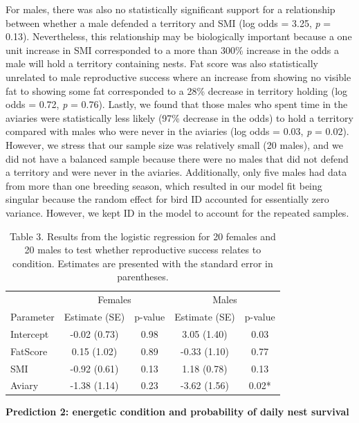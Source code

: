 \documentclass[
]{article}
\begin{document}
For males, there was also no statistically significant support for a
relationship between whether a male defended a territory and SMI (log
odds = 3.25, \emph{p} = 0.13). Nevertheless, this relationship may be
biologically important because a one unit increase in SMI corresponded
to a more than 300\% increase in the odds a male will hold a territory
containing nests. Fat score was also statistically unrelated to male
reproductive success where an increase from showing no visible fat to
showing some fat corresponded to a 28\% decrease in territory holding
(log odds = 0.72, \emph{p} = 0.76). Lastly, we found that those males
who spent time in the aviaries were statistically less likely (97\%
decrease in the odds) to hold a territory compared with males who were
never in the aviaries (log odds = 0.03, \emph{p} = 0.02). However, we
stress that our sample size was relatively small (20 males), and we did
not have a balanced sample because there were no males that did not
defend a territory and were never in the aviaries. Additionally, only
five males had data from more than one breeding season, which resulted
in our model fit being singular because the random effect for bird ID
accounted for essentially zero variance. However, we kept ID in the
model to account for the repeated samples.

\begin{table}

\caption{\label{tab:p2 main results}Table 3. Results from the logistic regression for 20 females and 20 males to test whether reproductive success relates to condition. Estimates are presented with the standard error in parentheses.}
\centering
\begin{tabular}[t]{lcccc}
\toprule
\multicolumn{1}{c}{ } & \multicolumn{2}{c}{Females} & \multicolumn{2}{c}{Males} \\
\cmidrule(l{3pt}r{3pt}){2-3} \cmidrule(l{3pt}r{3pt}){4-5}
Parameter & Estimate (SE) & p-value & Estimate (SE) & p-value\\
\midrule
Intercept & -0.02 (0.73) & 0.98 & 3.05 (1.40) & 0.03\\
FatScore & 0.15 (1.02) & 0.89 & -0.33 (1.10) & 0.77\\
SMI & -0.92 (0.61) & 0.13 & 1.18 (0.78) & 0.13\\
Aviary & -1.38 (1.14) & 0.23 & -3.62 (1.56) & 0.02*\\
\bottomrule
\end{tabular}
\end{table}

\textbf{Prediction 2: energetic condition and probability of daily nest
survival}
\end{document}
